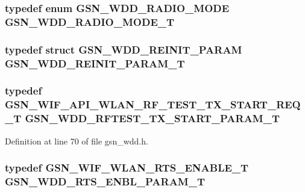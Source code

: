 \label{a00603_a33ed28c15746622883e32280cde99faa}
\hypertarget{a00603_a66d764097f36dbea8341b9591e8dc9cf}{
\subsubsection[{GSN\_\-WDD\_\-RADIO\_\-MODE\_\-T}]{\setlength{\rightskip}{0pt plus 5cm}typedef enum {\bf GSN\_\-WDD\_\-RADIO\_\-MODE} {\bf GSN\_\-WDD\_\-RADIO\_\-MODE\_\-T}}}
\label{a00603_a66d764097f36dbea8341b9591e8dc9cf}
\hypertarget{a00603_a8aef612ff6b195fa978a7e8e88c66baa}{
\subsubsection[{GSN\_\-WDD\_\-REINIT\_\-PARAM\_\-T}]{\setlength{\rightskip}{0pt plus 5cm}typedef struct {\bf GSN\_\-WDD\_\-REINIT\_\-PARAM} {\bf GSN\_\-WDD\_\-REINIT\_\-PARAM\_\-T}}}
\label{a00603_a8aef612ff6b195fa978a7e8e88c66baa}
\hypertarget{a00603_a842373dad0ceeafe062cf1827dbd8e54}{
\subsubsection[{GSN\_\-WDD\_\-RFTEST\_\-TX\_\-START\_\-PARAM\_\-T}]{\setlength{\rightskip}{0pt plus 5cm}typedef {\bf GSN\_\-WIF\_\-API\_\-WLAN\_\-RF\_\-TEST\_\-TX\_\-START\_\-REQ\_\-T} {\bf GSN\_\-WDD\_\-RFTEST\_\-TX\_\-START\_\-PARAM\_\-T}}}
\label{a00603_a842373dad0ceeafe062cf1827dbd8e54}


Definition at line 70 of file gsn\_\-wdd.h.

\hypertarget{a00603_acb20c85ccb97eb810fe9a5dbb403f1ae}{
\subsubsection[{GSN\_\-WDD\_\-RTS\_\-ENBL\_\-PARAM\_\-T}]{\setlength{\rightskip}{0pt plus 5cm}typedef {\bf GSN\_\-WIF\_\-WLAN\_\-RTS\_\-ENABLE\_\-T} {\bf GSN\_\-WDD\_\-RTS\_\-ENBL\_\-PARAM\_\-T}}}
\label{a00603_acb20c85ccb97eb810fe9a5dbb403f1ae}


